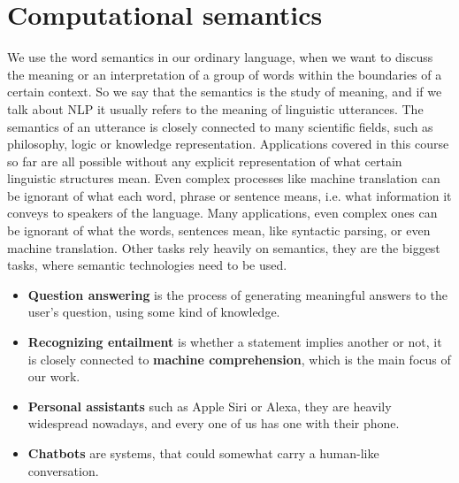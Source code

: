 \section{Computational semantics}
We use the word semantics in our ordinary language, when we want to discuss the meaning or an interpretation of a group of words within the boundaries of a certain context.
So we say that the semantics is the study of meaning, and if we talk about NLP it usually refers to the meaning of linguistic utterances.
The semantics of an utterance is closely connected to many scientific fields, such as philosophy, logic or knowledge representation.
Applications covered in this course so far are all possible without any explicit representation of what certain linguistic structures mean.
Even complex processes like machine translation can be ignorant of what each word, phrase or sentence means, i.e. what information it conveys to speakers of the language.
Many applications, even complex ones can be ignorant of what the words, sentences mean, like syntactic parsing, or even machine translation. Other tasks rely heavily on semantics, they are the biggest tasks, where semantic technologies need to be used.
\begin{itemize}
  \item \textbf{Question answering} is the process of generating meaningful answers to the user's question, using some kind of knowledge.
  \item \textbf{Recognizing entailment} is whether a statement implies another or not, it is closely connected to \textbf{machine comprehension}, which is the main focus of our work.
  \item \textbf{Personal assistants} such as Apple Siri or Alexa, they are heavily widespread nowadays, and every one of us has one with their phone.
  \item \textbf{Chatbots} are systems, that could somewhat carry a human-like conversation.
\end{itemize}



